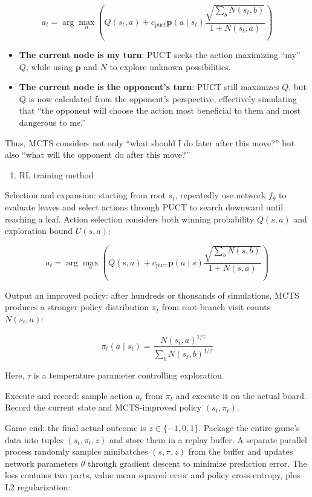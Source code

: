 \[
a_t=\arg\max_a\left(Q(s_t,a)+c_{\mathrm{puct}}\mathbf{p}(a\mid s_t)\frac{\sqrt{\sum_b N(s_t,b)}}{1+N(s_t,a)}\right)
\]

\begin{itemize}
\tightlist
\item
  \textbf{The current node is my turn}: PUCT seeks the action maximizing ``my'' \(Q\), while using \(\mathbf{p}\) and \(N\) to explore unknown possibilities.
\item
  \textbf{The current node is the opponent's turn}: PUCT still maximizes \(Q\), but \(Q\) is now calculated from the opponent's perspective, effectively simulating that ``the opponent will choose the action most beneficial to them and most dangerous to me.''
\end{itemize}

Thus, MCTS considers not only ``what should I do later after this move?'' but also ``what will the opponent do after this move?''

\begin{enumerate}
\def\labelenumi{(\arabic{enumi})}
\setcounter{enumi}{2}
\tightlist
\item
  RL training method
\end{enumerate}

Selection and expansion: starting from root \(s_t\), repeatedly use network \(f_\theta\) to evaluate leaves and select actions through PUCT to search downward until reaching a leaf. Action selection considers both winning probability \(Q(s,a)\) and exploration bound \(U(s,a)\):

\[
a_t=\arg\max_a\left(Q(s,a)+c_{\mathrm{puct}}\mathbf{p}(a\mid s)\frac{\sqrt{\sum_b N(s,b)}}{1+N(s,a)}\right)
\]

Output an improved policy: after hundreds or thousands of simulations, MCTS produces a stronger policy distribution \(\pi_t\) from root-branch visit counts \(N(s_t,a)\):

\[
\pi_t(a\mid s_t)=\frac{N(s_t,a)^{1/\tau}}{\sum_b N(s_t,b)^{1/\tau}}
\]

Here, \(\tau\) is a temperature parameter controlling exploration.

Execute and record: sample action \(a_t\) from \(\pi_t\) and execute it on the actual board. Record the current state and MCTS-improved policy \((s_t,\pi_t)\).

Game end: the final actual outcome is \(z\in\{-1,0,1\}\). Package the entire game's data into tuples \((s_t,\pi_t,z)\) and store them in a replay buffer. A separate parallel process randomly samples minibatches \((s,\pi,z)\) from the buffer and updates network parameters \(\theta\) through gradient descent to minimize prediction error. The loss contains two parts, value mean squared error and policy cross-entropy, plus L2 regularization:

